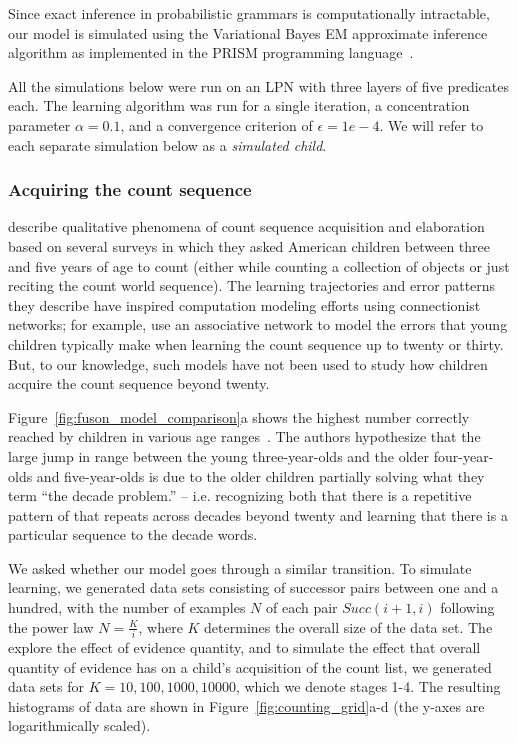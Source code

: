 \documentclass[10pt,letterpaper]{article}
\begin{document}
Since exact inference in probabilistic grammars is computationally
intractable, our model is simulated using the Variational Bayes EM
approximate inference algorithm as implemented in the PRISM
programming language~\citep{sato2008variational}.

All the simulations below were run on an LPN with three layers of five
predicates each. The learning algorithm was run for a single
iteration, a concentration parameter $\alpha=0.1$, and a convergence
criterion of $\epsilon=1e-4$. We will refer to each separate
simulation below as a \emph{simulated child}.

\subsubsection{Acquiring the count sequence}

\citeauthor{FusRicBriar1982} describe qualitative phenomena of
count sequence acquisition and elaboration based on several surveys in
which they asked American children between three and five years of age
to count (either while counting a collection of objects or just
reciting the count world sequence). The learning trajectories and
error patterns they describe have inspired computation modeling
efforts using connectionist networks; for example,
\citet{ma1989modeling} use an associative network to model the errors
that young children typically make when learning the count sequence up
to twenty or thirty. But, to our knowledge, such models have not been
used to study how children acquire the count sequence beyond twenty.


Figure~\ref{fig:fuson_model_comparison}a shows the highest number
correctly reached by children in various age
ranges~\cite{FusRicBriar1982}. The authors hypothesize that the large
jump in range between the young three-year-olds and the older
four-year-olds and five-year-olds is due to the older children
partially solving what they term ``the decade problem.'' -- i.e.
recognizing both that there is a repetitive pattern of that repeats
across decades beyond twenty and learning that there is a particular
sequence to the decade words.

We asked whether our model goes through a similar transition. To
simulate learning, we generated data sets consisting of successor
pairs between one and a hundred, with the number of examples $N$ of each
pair $Succ(i+1, i)$ following the power law $N=\frac{K}{i}$, where $K$
determines the overall size of the data set. The explore the effect of
evidence quantity, and to simulate the effect that overall quantity
of evidence has on a child's acquisition of the count list, we
generated data sets for $K=10, 100, 1000, 10000$, which we denote
stages 1-4. The resulting histograms of data are shown in
Figure~\ref{fig:counting_grid}a-d (the y-axes are logarithmically
scaled).
\end{document}

